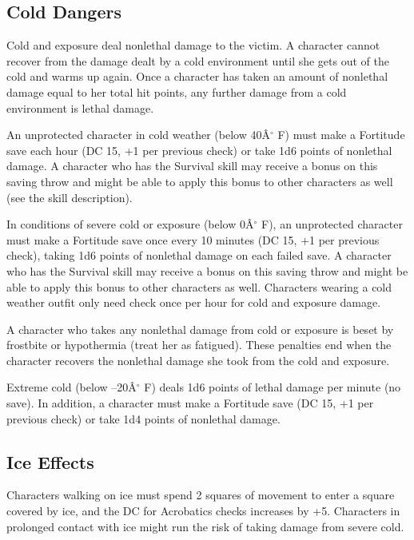 \subsection{Cold Dangers}

				
Cold and exposure deal nonlethal damage to the victim. A character cannot recover from the damage dealt by a cold environment until she gets out of the cold and warms up again. Once a character has taken an amount of nonlethal damage equal to her total hit points, any further damage from a cold environment is lethal damage. 
				
An unprotected character in cold weather (below 40\^A\mbox{${}^\circ$} F) must make a Fortitude save each hour (DC 15, +1 per previous check) or take 1d6 points of nonlethal damage. A character who has the Survival skill may receive a bonus on this saving throw and might be able to apply this bonus to other characters as well (see the skill description).
				
In conditions of severe cold or exposure (below 0\^A\mbox{${}^\circ$} F), an unprotected character must make a Fortitude save once every 10 minutes (DC 15, +1 per previous check), taking 1d6 points of nonlethal damage on each failed save. A character who has the Survival skill may receive a bonus on this saving throw and might be able to apply this bonus to other characters as well. Characters wearing a cold weather outfit only need check once per hour for cold and exposure damage.
				
A character who takes any nonlethal damage from cold or exposure is beset by frostbite or hypothermia (treat her as fatigued). These penalties end when the character recovers the nonlethal damage she took from the cold and exposure.
				
Extreme cold (below --20\^A\mbox{${}^\circ$} F) deals 1d6 points of lethal damage per minute (no save). In addition, a character must make a Fortitude save (DC 15, +1 per previous check) or take 1d4 points of nonlethal damage.
				
\subsection{Ice Effects}

				
Characters walking on ice must spend 2 squares of movement to enter a square covered by ice, and the DC for Acrobatics checks increases by +5. Characters in prolonged contact with ice might run the risk of taking damage from severe cold.
				
